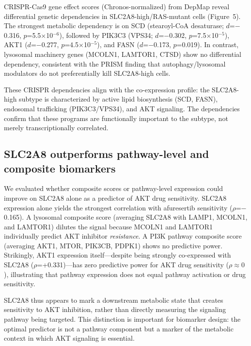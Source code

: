 \documentclass[12pt]{article}
\begin{document}
CRISPR-Cas9 gene effect scores (Chronos-normalized) from DepMap reveal
differential genetic dependencies in SLC2A8-high/RAS-mutant cells
(Figure~5). The strongest metabolic dependency is on SCD (stearoyl-CoA
desaturase; $d$=$-$0.316, $p$=5.5$\times$10$^{-6}$), followed by PIK3C3
(VPS34; $d$=$-$0.302, $p$=7.5$\times$10$^{-5}$), AKT1 ($d$=$-$0.277,
$p$=4.5$\times$10$^{-5}$), and FASN ($d$=$-$0.173, $p$=0.019). In
contrast, lysosomal machinery genes (MCOLN1, LAMTOR1, CTSD) show no
differential dependency, consistent with the PRISM finding that
autophagy/lysosomal modulators do not preferentially kill SLC2A8-high
cells.

These CRISPR dependencies align with the co-expression profile: the
SLC2A8-high subtype is characterized by active lipid biosynthesis (SCD,
FASN), endosomal trafficking (PIK3C3/VPS34), and AKT signaling. The
dependencies confirm that these programs are functionally important to
the subtype, not merely transcriptionally correlated.

\subsection{SLC2A8 outperforms pathway-level and composite biomarkers}

We evaluated whether composite scores or pathway-level expression could
improve on SLC2A8 alone as a predictor of AKT drug sensitivity. SLC2A8
expression alone yields the strongest correlation with afuresertib
sensitivity ($\rho$=$-$0.165). A lysosomal composite score (averaging
SLC2A8 with LAMP1, MCOLN1, and LAMTOR1) dilutes the signal because
MCOLN1 and LAMTOR1 individually predict AKT inhibitor \emph{resistance}.
A PI3K pathway composite score (averaging AKT1, MTOR, PIK3CB, PDPK1)
shows no predictive power. Strikingly, AKT1 expression itself---despite
being strongly co-expressed with SLC2A8 ($\rho$=+0.331)---has zero
predictive power for AKT drug sensitivity ($\rho \approx 0$), illustrating
that pathway expression does not equal pathway activation or drug
sensitivity.

SLC2A8 thus appears to mark a downstream metabolic state that creates
sensitivity to AKT inhibition, rather than directly measuring the
signaling pathway being targeted. This distinction is important for
biomarker design: the optimal predictor is not a pathway component but a
marker of the metabolic context in which AKT signaling is essential.

\end{document}
